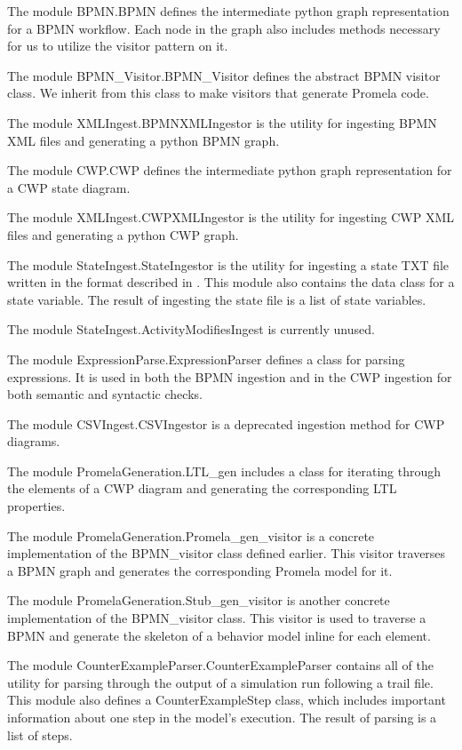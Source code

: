 The module BPMN.BPMN defines the intermediate python graph representation for a BPMN workflow. Each node in the graph also includes methods necessary for us to utilize the visitor pattern on it.

The module BPMN\_Visitor.BPMN\_Visitor defines the abstract BPMN visitor class. We inherit from this class to make visitors that generate Promela code.

The module XMLIngest.BPMNXMLIngestor is the utility for ingesting BPMN XML files and generating a python BPMN graph.

The module CWP.CWP defines the intermediate python graph representation for a CWP state diagram.

The module XMLIngest.CWPXMLIngestor is the utility for ingesting CWP XML files and generating a python CWP graph.

The module StateIngest.StateIngestor is the utility for ingesting a state TXT file written in the format described in . This module also contains the data class for a state variable. The result of ingesting the state file is a list of state variables.

The module StateIngest.ActivityModifiesIngest is currently unused.

The module ExpressionParse.ExpressionParser defines a class for parsing expressions. It is used in both the BPMN ingestion and in the CWP ingestion for both semantic and syntactic checks.

The module CSVIngest.CSVIngestor is a deprecated ingestion method for CWP diagrams.

The module PromelaGeneration.LTL\_gen includes a class for iterating through the elements of a CWP diagram and generating the corresponding LTL properties.

The module PromelaGeneration.Promela\_gen\_visitor is a concrete implementation of the BPMN\_visitor class defined earlier. This visitor traverses a BPMN graph and generates the corresponding Promela model for it. 

The module PromelaGeneration.Stub\_gen\_visitor is another concrete implementation of the BPMN\_visitor class. This visitor is used to traverse a BPMN and generate the skeleton of a behavior model inline for each element.

The module CounterExampleParser.CounterExampleParser contains all of the utility for parsing through the output of a simulation run following a trail file. This module also defines a CounterExampleStep class, which includes important information about one step in the model's execution. The result of parsing is a list of steps.

